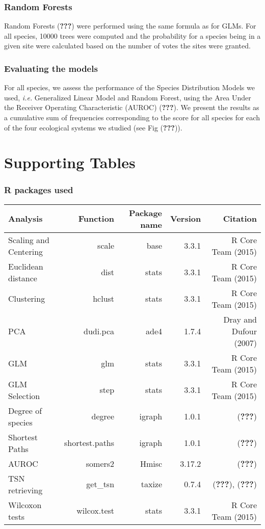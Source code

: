 \subsubsection{Random Forests}\label{random-forests}

Random Forests ({\textbf{???}}) were performed using the same formula as
for GLMs. For all species, 10000 trees were computed and the probability
for a species being in a given site were calculated based on the number
of votes the sites were granted.

\subsubsection{Evaluating the models}\label{evaluating-the-models}

For all species, we assess the performance of the Species Distribution
Models we used, \emph{i.e.} Generalized Linear Model and Random Forest,
using the Area Under the Receiver Operating Characteristic (AUROC)
({\textbf{???}}). We present the results as a cumulative sum of
frequencies corresponding to the score for all species for each of the
four ecological systems we studied (see Fig ({\textbf{???}})).

\section{Supporting Tables}\label{supporting-tables}

\subsubsection{R packages used}\label{r-packages-used}

\begin{longtable}[]{@{}lrrrr@{}}
\toprule
Analysis & Function & Package name & Version & Citation\tabularnewline
\midrule
\endhead
Scaling and Centering & scale & base & 3.3.1 & R Core Team
(2015)\tabularnewline
Euclidean distance & dist & stats & 3.3.1 & R Core Team
(2015)\tabularnewline
Clustering & hclust & stats & 3.3.1 & R Core Team (2015)\tabularnewline
PCA & dudi.pca & ade4 & 1.7.4 & Dray and Dufour (2007)\tabularnewline
GLM & glm & stats & 3.3.1 & R Core Team (2015)\tabularnewline
GLM Selection & step & stats & 3.3.1 & R Core Team (2015)\tabularnewline
Degree of species & degree & igraph & 1.0.1 &
({\textbf{???}})\tabularnewline
Shortest Paths & shortest.paths & igraph & 1.0.1 &
({\textbf{???}})\tabularnewline
AUROC & somers2 & Hmisc & 3.17.2 & ({\textbf{???}})\tabularnewline
TSN retrieving & get\_tsn & taxize & 0.7.4 & ({\textbf{???}}),
({\textbf{???}})\tabularnewline
Wilcoxon tests & wilcox.test & stats & 3.3.1 & R Core Team
(2015)\tabularnewline
\bottomrule
\end{longtable}

